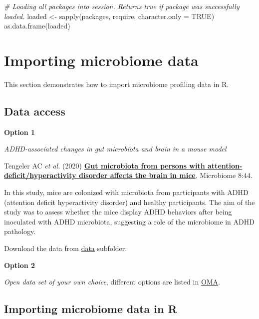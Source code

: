 \documentclass[
  oneside]{book}
\newenvironment{Shaded}{\begin{snugshade}}{\end{snugshade}}
\newcommand{\AttributeTok}[1]{\textcolor[rgb]{0.77,0.63,0.00}{#1}}
\newcommand{\CommentTok}[1]{\textcolor[rgb]{0.56,0.35,0.01}{\textit{#1}}}
\newcommand{\ConstantTok}[1]{\textcolor[rgb]{0.00,0.00,0.00}{#1}}
\newcommand{\FunctionTok}[1]{\textcolor[rgb]{0.00,0.00,0.00}{#1}}
\newcommand{\NormalTok}[1]{#1}
\newcommand{\OtherTok}[1]{\textcolor[rgb]{0.56,0.35,0.01}{#1}}
\begin{document}
\begin{Shaded}
\begin{Highlighting}[]
\CommentTok{\# Loading all packages into session. Returns true if package was successfully loaded.}
\NormalTok{loaded }\OtherTok{\textless{}{-}} \FunctionTok{sapply}\NormalTok{(packages, require, }\AttributeTok{character.only =} \ConstantTok{TRUE}\NormalTok{)}
\FunctionTok{as.data.frame}\NormalTok{(loaded)}
\end{Highlighting}
\end{Shaded}

\hypertarget{importing-microbiome-data}{%
\chapter{Importing microbiome data}\label{importing-microbiome-data}}

This section demonstrates how to import microbiome profiling data in R.

\hypertarget{data-access}{%
\section{Data access}\label{data-access}}

\textbf{Option 1}

\emph{ADHD-associated changes in gut microbiota and brain in a mouse model}

Tengeler AC \emph{et
al.} (2020) \href{https://doi.org/10.1186/s40168-020-00816-x}{\textbf{Gut microbiota from persons with
attention-deficit/hyperactivity disorder affects the brain in
mice}}. Microbiome
8:44.

In this study, mice are colonized with microbiota from participants
with ADHD (attention deficit hyperactivity disorder) and healthy
participants. The aim of the study was to assess whether the mice
display ADHD behaviors after being inoculated with ADHD microbiota,
suggesting a role of the microbiome in ADHD pathology.

Download the data from
\href{https://github.com/microbiome/course_2022_radboud/tree/main/data}{data}
subfolder.

\textbf{Option 2}

\emph{Open data set of your own choice}, different options are listed in \href{https://microbiome.github.io/OMA/containers.html\#example-data}{OMA}.

\hypertarget{importing-microbiome-data-in-r}{%
\section{Importing microbiome data in R}\label{importing-microbiome-data-in-r}}
\end{document}
